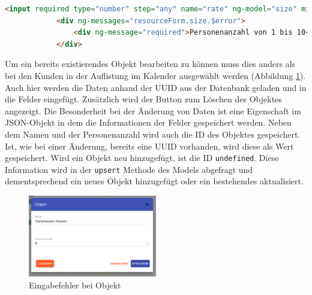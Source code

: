  \begin{lstlisting}[language=HTML, label=code_exampleRegistrationRequest, caption=Validierung der Personenanzahl im View]
		<input required type="number" step="any" name="rate" ng-model="size" min="1" max="10"  />
            <div ng-messages="resourceForm.size.$error">
                <div ng-message="required">Personenanzahl von 1 bis 10</div>
            </div>
\end{lstlisting}
 
 

Um ein bereits existierendes Objekt bearbeiten zu können muss dies anders als bei den Kunden in der Auflistung im Kalender ausgewählt
werden (Abbildung \ref{frontend_resource_edit}). Auch hier werden die Daten anhand der UUID aus der Datenbank geladen und in die Felder eingefügt.
Zusätzlich wird der Button zum Löschen des Objektes angezeigt. Die Besonderheit bei der Änderung von Daten ist eine Eigenschaft im JSON-Objekt in dem
die Informationen der Felder gespeichert werden. Neben dem Namen und der Personenanzahl wird auch die ID des Objektes gespeichert. Ist, wie bei einer Änderung,
bereits eine UUID vorhanden, wird diese als Wert gespeichert. Wird ein Objekt neu hinzugefügt, ist die ID \texttt{undefined}. Diese Information wird in der
\texttt{upsert} Methode des Models abgefragt und dementsprechend ein neues Objekt hinzugefügt oder ein bestehendes aktualisiert.

\begin{figure}[H]
\centering\includegraphics[width=0.5\textwidth]{images/frontend_resource_edit.png}
\caption{Eingabefehler bei Objekt}
\label{frontend_resource_edit}
\end{figure}
  
